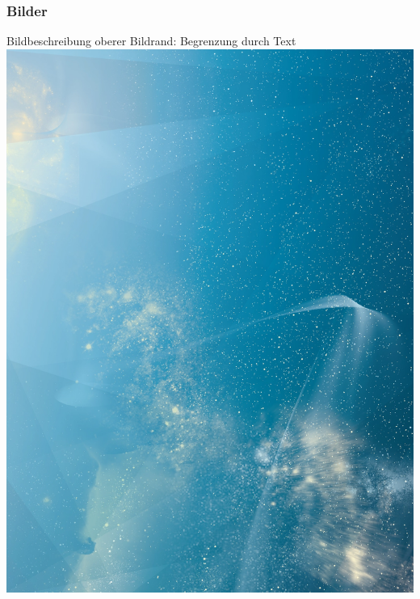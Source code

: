 \begin{frame}
    \frametitle{Bilder}
    
Bildbeschreibung\newline
oberer Bildrand: Begrenzung durch Text\\[\baselineskip]

\mbox{\includegraphics[height=.5\paperheight, trim=0cm 14cm 0cm 0cm, clip=true]{./Ressourcen/_Bilder/SternenhimmelHochkant.jpg}}%
\hspace{6.5mm}%

\end{frame}
